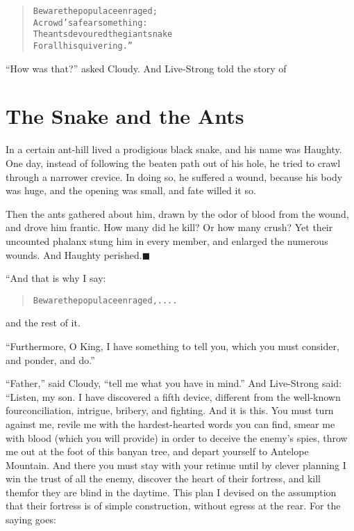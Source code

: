 \documentclass[article, twoside, 14pt]{memoir}
\newcommand{\qed}{\hfill \ensuremath{\blacksquare}}
\renewenvironment{verbatim}{%
\begin{quote}%
\vskip -10pt%
\begin{alltt}\normalfont\large}{\end{alltt}%
\end{quote}%
\vskip -10pt
} %
\begin{document}
\begin{verbatim}
Beware the populace enraged;
    A crowd's a fearsome thing:
The ants devoured the giant snake
    For all his quivering.”
\end{verbatim}
``How was that?'' asked Cloudy. And Live-Strong told the story of

\chapter{The Snake and the Ants}

\label{s52}

In a certain ant-hill lived a prodigious black snake, and his
name was Haughty. One day, instead of following the beaten path out
of his hole, he tried to crawl through a narrower crevice. In doing
so, he suffered a wound, because his body was huge, and the opening
was small, and fate willed it so.

Then the ants gathered about him, drawn by the odor of blood from
the wound, and drove him frantic. How many did he kill? Or how many
crush? Yet their uncounted phalanx stung him in every member, and
enlarged the numerous wounds. And Haughty
perished.\hyperref[s52]{\qed}

“And that is why I say:

\begin{verbatim}
Beware the populace enraged, ....
\end{verbatim}
and the rest of it.

``Furthermore, O King, I have something to tell you, which you must consider, and ponder, and do.''

``Father,'' said Cloudy, ``tell me what you have in mind.'' And
Live-Strong said: “Listen, my son. I have discovered a fifth
device, different from the well-known four{\textemdash}conciliation,
intrigue, bribery, and fighting. And it is this. You must turn
against me, revile me with the hardest-hearted words you can find,
smear me with blood (which you will provide) in order to deceive
the enemy's spies, throw me out at the foot of this banyan tree,
and depart yourself to Antelope Mountain. And there you must stay
with your retinue until by clever planning I win the trust of all
the enemy, discover the heart of their fortress, and kill
them{\textemdash}for they are blind in the daytime. This plan I devised on
the assumption that their fortress is of simple construction,
without egress at the rear. For the saying goes:
\end{document}
